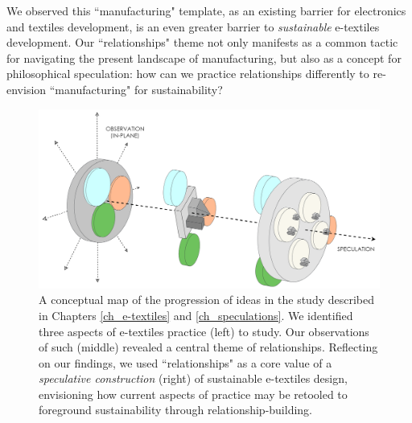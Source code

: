 We observed this ``manufacturing" template, as an existing barrier for electronics and textiles development, is an even greater barrier to \textit{sustainable} e-textiles development. Our ``relationships" theme not only manifests as a common tactic for navigating the present landscape of manufacturing, but also as a concept for philosophical speculation: how can we practice relationships differently to re-envision ``manufacturing" for sustainability? 

\begin{figure}[ht]
  \centering
  \includegraphics[width=\textwidth]{figs/EST_Discussion.png}
  \caption[Conceptual map of the progression of ideas in the E-Textiles \& Speculations study.]{%
  A conceptual map of the progression of ideas in the study described in Chapters \ref{ch_e-textiles} and \ref{ch_speculations}. We identified three aspects of e-textiles practice (left) to study. Our observations of such (middle) revealed a central theme of relationships. Reflecting on our findings, we used ``relationships" as a core value of a \textit{speculative construction} (right) of sustainable e-textiles design, envisioning how current aspects of practice may be retooled to foreground sustainability through relationship-building.}
  \label{fig:spec-visioning}
\end{figure}

